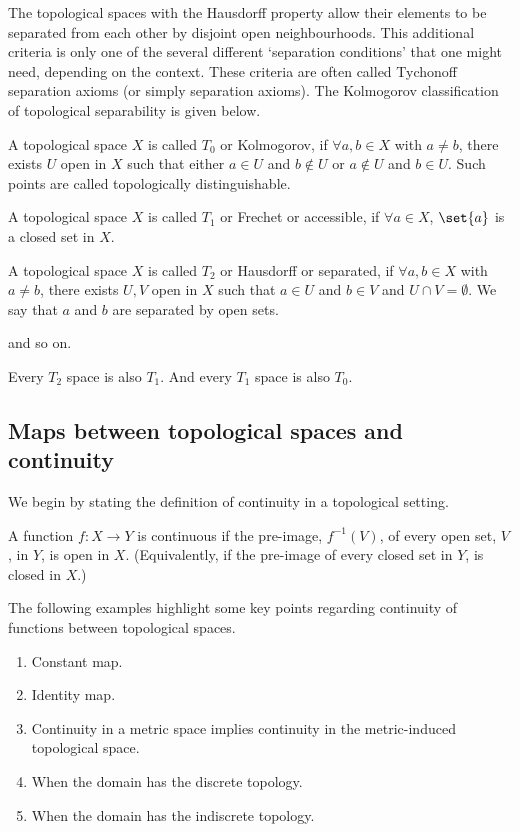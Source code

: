 The topological spaces with the Hausdorff property allow their elements to be separated from each other by disjoint open neighbourhoods. This additional criteria is only one of the several different `separation conditions' that one might need, depending on the context. These criteria are often called Tychonoff separation axioms (or simply separation axioms). The Kolmogorov classification of topological separability is given below.
\begin{ndfn}[$T_{0}$ spaces]
  A topological space $X$ is called $T_0$ or Kolmogorov, if $\forall a, b \in X$ with $a \neq b$, there exists $U$ open in $X$ such that either $a \in U$ and $b \notin U$ or $a \notin U$ and $b \in U$. Such points are called topologically distinguishable.
\end{ndfn}

\begin{ndfn}[$T_{1}$ spaces]
  A topological space $X$ is called $T_1$ or Frechet or accessible, if $\forall a \in X$, $\set{a}$ is a closed set in $X$.
\end{ndfn}

\begin{ndfn}[$T_{2}$ spaces]
  A topological space $X$ is called $T_2$ or Hausdorff or separated, if $\forall a, b \in X$ with $a \neq b$, there exists $U, V$ open in $X$ such that $a \in U$ and $b \in V$ and $U \cap V = \emptyset$. We say that $a$ and $b$ are separated by open sets.
\end{ndfn}
and so on.

\begin{nlemma}
  Every $T_2$ space is also $T_1$. And every $T_1$ space is also $T_0$.
\end{nlemma}

\subsection{Maps between topological spaces and continuity}
We begin by stating the definition of continuity in a topological setting.
\begin{ndfn}
  A function $f : X \to Y$ is continuous if the pre-image, $f^{-1}(V)$, of every open set, $V$, in $Y$, is open in $X$. (Equivalently, if the pre-image of every closed set in $Y$, is closed in $X$.)
\end{ndfn}

\begin{negg}
  The following examples highlight some key points regarding continuity of functions between topological spaces.
  \begin{enumerate}
  \item Constant map.
  \item Identity map.
  \item Continuity in a metric space implies continuity in the metric-induced topological space.
  \item When the domain has the discrete topology.
  \item When the domain has the indiscrete topology.
  \end{enumerate}
\end{negg}


